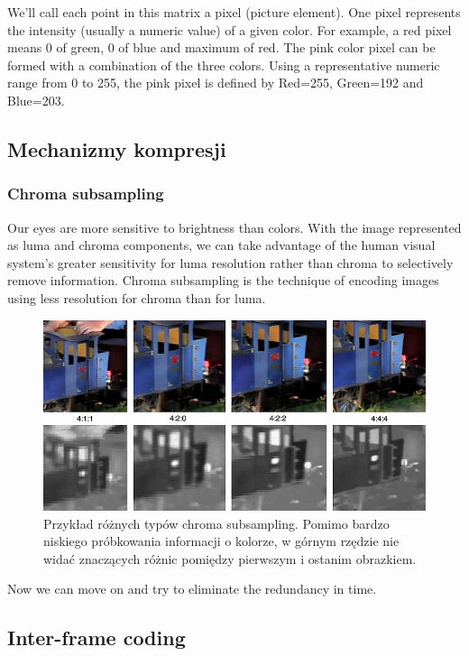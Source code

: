 We'll call each point in this matrix a pixel (picture element). One pixel represents the intensity
(usually a numeric value) of a given color. For example, a red pixel means 0 of green, 0 of blue and
maximum of red. The pink color pixel can be formed with a combination of the three colors. Using a
representative numeric range from 0 to 255, the pink pixel is defined by Red=255, Green=192 and
Blue=203.

\subsection{Mechanizmy kompresji}

\subsubsection{Chroma subsampling}

Our eyes are more sensitive to brightness than colors. With the image represented as luma and chroma
components, we can take advantage of the human visual system's greater sensitivity for luma
resolution rather than chroma to selectively remove information. Chroma subsampling is the technique
of encoding images using less resolution for chroma than for luma.

\begin{figure}[H]
	\centering
	\includegraphics[width=\textwidth]{img/rozdzial2/chroma_subsampling_examples}
	\caption{Przykład różnych typów chroma subsampling. Pomimo bardzo niskiego próbkowania informacji o kolorze, w górnym rzędzie nie widać znaczących różnic pomiędzy pierwszym i ostanim obrazkiem.}
\end{figure}

Now we can move on and try to eliminate the redundancy in time.

\subsection{Inter-frame coding}

